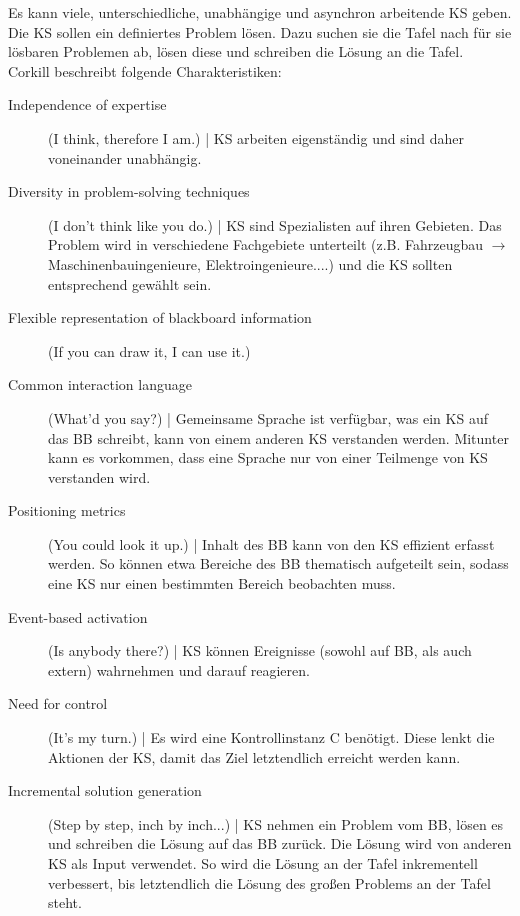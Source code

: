 \documentclass{article} %
\begin{document}
	Es kann viele, unterschiedliche, unabhängige und asynchron arbeitende KS geben. Die KS sollen ein definiertes Problem lösen. Dazu suchen sie die Tafel nach für sie lösbaren Problemen ab, lösen diese und schreiben die Lösung an die Tafel.\\
	Corkill beschreibt folgende Charakteristiken:
	\begin{description}
		\item[Independence of expertise] (I think, therefore I am.) | KS arbeiten eigenständig und sind daher voneinander unabhängig.
		\item[Diversity in problem-solving techniques] (I don’t think like you do.) | KS sind Spezialisten auf ihren Gebieten.
		Das Problem wird in verschiedene Fachgebiete unterteilt (z.B. Fahrzeugbau $\rightarrow$ Maschinenbauingenieure, Elektroingenieure....) und die KS sollten entsprechend gewählt sein.
		\item[Flexible representation of blackboard information] (If you can draw it, I can use it.) 
		\item[Common interaction language] (What’d you say?) | Gemeinsame Sprache ist verfügbar, was ein KS auf das BB schreibt, kann von einem anderen KS verstanden werden.
		Mitunter kann es vorkommen, dass eine Sprache nur von einer Teilmenge von KS verstanden wird.
		\item[Positioning metrics] (You could look it up.) | Inhalt des BB kann von den KS effizient erfasst werden.
		So können etwa Bereiche des BB thematisch aufgeteilt sein, sodass eine KS nur einen bestimmten Bereich beobachten muss.
		\item[Event-based activation] (Is anybody there?) | KS können Ereignisse (sowohl auf BB, als auch extern) wahrnehmen und darauf reagieren.	
		\item[Need for control] (It’s my turn.) | Es wird eine Kontrollinstanz C benötigt.
		Diese lenkt die Aktionen der KS, damit das Ziel letztendlich erreicht werden kann.
		\item[Incremental solution generation] (Step by step, inch by inch...) | KS nehmen ein Problem vom BB, lösen es und schreiben die Lösung auf das BB zurück.
		Die Lösung wird von anderen KS als Input verwendet.
		So wird die Lösung an der Tafel inkrementell verbessert, bis letztendlich die Lösung des großen Problems an der Tafel steht.
	\end{description}
\end{document}
